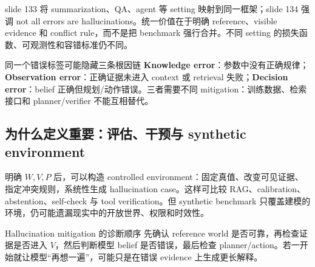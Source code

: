 slide 133 将 summarization、QA、agent 等 setting 映射到同一框架；slide 134 强调 not all errors are hallucinations。统一价值在于明确 reference、visible evidence 和 conflict rule，而不是把 benchmark 强行合并。不同 setting 的损失函数、可观测性和容错标准仍不同。



\begin{warningbox}{同一个错误标签可能隐藏三条根因链}
\textbf{Knowledge error}：参数中没有正确规律；\textbf{Observation error}：正确证据未进入 context 或 retrieval 失败；\textbf{Decision error}：belief 正确但规划/动作错误。三者需要不同 mitigation：训练数据、检索接口和 planner/verifier 不能互相替代。
\end{warningbox}

\subsection{为什么定义重要：评估、干预与 synthetic environment}

明确 $W,V,P$ 后，可以构造 controlled environment：固定真值、改变可见证据、指定冲突规则，系统性生成 hallucination case。这样可比较 RAG、calibration、abstention、self-check 与 tool verification。但 synthetic benchmark 只覆盖建模的环境，仍可能遗漏现实中的开放世界、权限和时效性。





\begin{importantbox}{Hallucination mitigation 的诊断顺序}
先确认 reference world 是否可靠，再检查证据是否进入 $V$，然后判断模型 belief 是否错误，最后检查 planner/action。若一开始就让模型“再想一遍”，可能只是在错误 evidence 上生成更长解释。
\end{importantbox}

